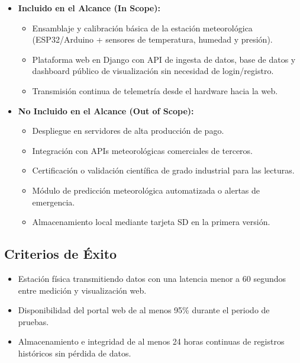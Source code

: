 \begin{itemize}
    \item \textbf{Incluido en el Alcance (In Scope):}
    \begin{itemize}
        \item Ensamblaje y calibración básica de la estación meteorológica (ESP32/Arduino + sensores de temperatura, humedad y presión).
        \item Plataforma web en Django con API de ingesta de datos, base de datos y dashboard público de visualización sin necesidad de login/registro.
        \item Transmisión continua de telemetría desde el hardware hacia la web.
    \end{itemize}

    \item \textbf{No Incluido en el Alcance (Out of Scope):}
    \begin{itemize}
        \item Despliegue en servidores de alta producción de pago.
        \item Integración con APIs meteorológicas comerciales de terceros.
        \item Certificación o validación científica de grado industrial para las lecturas.
        \item Módulo de predicción meteorológica automatizada o alertas de emergencia.
        \item Almacenamiento local mediante tarjeta SD en la primera versión.
    \end{itemize}
\end{itemize}

\subsection{Criterios de Éxito}
\begin{itemize}
    \item Estación física transmitiendo datos con una latencia menor a 60 segundos entre medición y visualización web. 
    \item Disponibilidad del portal web de al menos 95\% durante el periodo de pruebas. 
    \item Almacenamiento e integridad de al menos 24 horas continuas de registros históricos sin pérdida de datos. 
\end{itemize}
